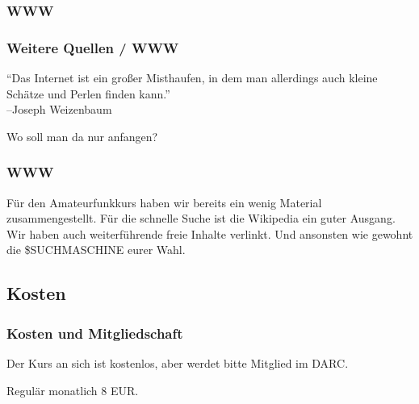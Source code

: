 \subsubsection{WWW}

\begin{frame}
    \frametitle{Weitere Quellen / WWW}

    \begin{exampleblock}{}
      "`Das Internet ist ein großer Misthaufen, in dem man allerdings auch kleine
      Schätze und Perlen finden kann."' \hyperlink{refs}{\cite{quote}} \\[1em]
      \flushright --Joseph Weizenbaum \\[4em]
    \end{exampleblock}

    \center Wo soll man da nur anfangen?

\end{frame}

\begin{frame}
    \frametitle{WWW}

    Für den Amateurfunkkurs haben wir bereits ein wenig
    Material \hyperlink{refs}{\cite{mat}} zusammengestellt. Für die schnelle
    Suche ist die Wikipedia \hyperlink{refs}{\cite{wp}} ein guter Ausgang. \\[2em]

    Wir haben auch weiterführende freie Inhalte \hyperlink{refs}{\cite{fi}}
    verlinkt. Und ansonsten wie gewohnt die \$SUCHMASCHINE eurer Wahl.

\end{frame}

\subsection{Kosten}

\begin{frame}
  \frametitle{Kosten und Mitgliedschaft}

  Der Kurs an sich ist kostenlos, aber werdet bitte Mitglied im DARC.

  Regulär monatlich 8 EUR.
\end{frame}

